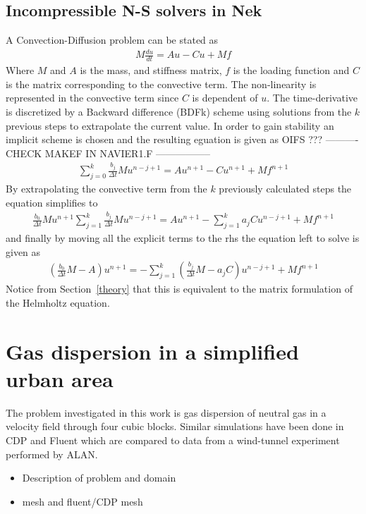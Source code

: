 \subsection{Incompressible N-S solvers in Nek}
A Convection-Diffusion problem can be stated as 
\begin{align}
    M\frac{du}{dt} = Au-Cu+Mf
    \label{eq:conv-diff}
\end{align}
% 
Where $M$ and $A$ is the mass, and stiffness matrix, $f$ is the loading function and $C$ is 
the matrix corresponding to the convective term. The non-linearity is represented in the 
convective term since $C$ is dependent of $u$.
The time-derivative is discretized by a Backward difference (BDFk) scheme using solutions 
from the $k$ previous steps to extrapolate the current value. In order to gain stability 
an implicit scheme is chosen and the resulting eguation is given as 
%
OIFS ???
---------- CHECK MAKEF IN NAVIER1.F ----------------- 
\begin{align}
    \sum_{j=0}^{k}\frac{b_j}{\Delta t}Mu^{n-j+1} = Au^{n+1}-Cu^{n+1}+Mf^{n+1}
    \label{eq:conv-diff}
\end{align}
% 
By extrapolating the convective term from the $k$ previously calculated steps the equation 
simplifies to 
%
\begin{align}
   \frac{b_0}{\Delta t}Mu^{n+1} \sum_{j=1}^{k}\frac{b_j}{\Delta t}Mu^{n-j+1} 
   = Au^{n+1}-\sum_{j=1}^{k}a_jCu^{n-j+1}+Mf^{n+1}
    \label{eq:conv-diff}
\end{align}
% 
and finally by moving all the explicit terms to the rhs the equation left to solve is given as 
%
\begin{align}
   (\frac{b_0}{\Delta t}M-A)u^{n+1} 
   = -\sum_{j=1}^{k}(\frac{b_j}{\Delta t}M-a_jC)u^{n-j+1}+Mf^{n+1}
    \label{eq:conv-diff}
\end{align}
% 
Notice from Section~\ref{theory} that this is equivalent to the matrix formulation of 
the Helmholtz equation.



\section{Gas dispersion in a simplified urban area}
The problem investigated in this work is gas dispersion of neutral gas in a velocity field through four cubic blocks.
Similar simulations have been done in CDP and Fluent which are compared to data from a wind-tunnel experiment performed by ALAN.
\begin{itemize}
	\item Description of problem and domain
	\item mesh and fluent/CDP mesh
\end{itemize}

